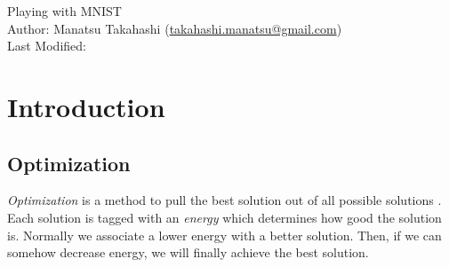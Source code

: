 \documentclass{article}
\theoremstyle{definition}
\begin{document}
\begin{center}
{\Large Playing with MNIST}\\
\enter
Author: Manatsu Takahashi (\href{mailto:takahashi.manatsu@gmail.com}{takahashi.manatsu@gmail.com})\\
Last Modified: \DTMnow
\end{center}

\enter
\begin{abstract}
In this tutorial paper, we learn what is and how to use Neural Network, which is an algorithm in the field of machine learning. We supply both theoretical explanations and a program which learns MNIST dataset to recognize hand-written digits. As for the program, it is written in C++ (not usual Python) without external library and the code structure is explained in detail. The final purpose is to create a web application in which a user draw a line and the program infers what the digit is. It should be easy to apply neural networks to another problem after reading this paper. All the source codes are available in github.com...
\end{abstract}

\enter
\tableofcontents


\newpage
\section{Introduction}


\subsection{Optimization}

{\it Optimization} is a method to pull the best solution out of all possible solutions \cite{1}. Each solution is tagged with an {\it energy} which determines how good the solution is. Normally we associate a lower energy with a better solution. Then, if we can somehow decrease energy, we will finally achieve the best solution.\\
\end{document}
